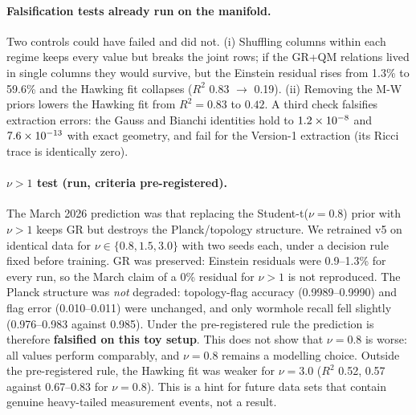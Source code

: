 \paragraph{Falsification tests already run on the manifold.} Two controls could have failed and did
not. (i) Shuffling columns within each regime keeps every value but breaks the joint rows; if the
GR+QM relations lived in single columns they would survive, but the Einstein residual rises from
1.3\% to 59.6\% and the Hawking fit collapses ($R^2$ 0.83 $\to$ 0.19). (ii) Removing the M-W priors
lowers the Hawking fit from $R^2=0.83$ to $0.42$. A third check falsifies extraction errors: the
Gauss and Bianchi identities hold to $1.2\times10^{-8}$ and $7.6\times10^{-13}$ with exact geometry, and fail for the
Version-1 extraction (its Ricci trace is identically zero).

\paragraph{$\nu>1$ test (run, criteria pre-registered).} The March 2026 prediction was that replacing
the Student-t($\nu=0.8$) prior with $\nu>1$ keeps GR but destroys the Planck/topology structure.
We retrained v5 on identical data for $\nu\in\{0.8,1.5,3.0\}$ with two seeds each, under a decision
rule fixed before training. GR was preserved: Einstein residuals were 0.9--1.3\% for every run, so
the March claim of a 0\% residual for $\nu>1$ is not reproduced. The Planck structure was \emph{not}
degraded: topology-flag accuracy (0.9989--0.9990) and flag error (0.010--0.011) were unchanged, and
only wormhole recall fell slightly (0.976--0.983 against 0.985). Under the pre-registered rule the
prediction is therefore \textbf{falsified on this toy setup}. This does not show that $\nu=0.8$ is
worse: all values perform comparably, and $\nu=0.8$ remains a modelling choice. Outside the
pre-registered rule, the Hawking fit was weaker for $\nu=3.0$ ($R^2$ 0.52, 0.57 against 0.67--0.83
for $\nu=0.8$). This is a hint for future data sets that contain genuine heavy-tailed measurement
events, not a result.

